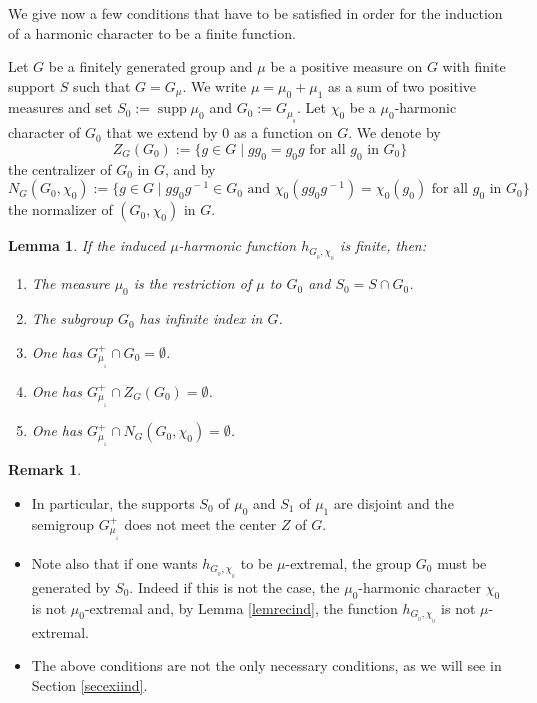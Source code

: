 \documentclass[JEP,XML,SOM,Unicode]{cedram}
\newenvironment{enumeratei}
{\bgroup\def\theenumi{\roman{enumi}}\def\theenumii{\arabic{enumii}}\begin{enumerate}}
{\end{enumerate}\egroup}
\DeclareMathOperator{\supp}{supp}
\newtheorem{Lem}[Thm]{Lemma}
\theoremstyle{definition}
\newtheorem{Rem}[Thm]{Remark}
\let\bq\relax
\let\eq\relax
\begin{document}
\bq
We give now a few conditions that have to be satisfied
in order for the induction of a harmonic character to be a finite function.
\eq

Let $G$ be a finitely generated group and
$\mu$ be a positive measure on $G$ with finite support $S$
such that $G=G_\mu$.
We write $\mu =\mu_0+\mu_1$ as a sum of two positive measures
and set $S_0:=\supp\mu_0$ and $G_0:=G_{\mu_{_0}}$.
Let $\chi_0$ be a $\mu_0$-harmonic character of $G_0$
that we extend by $0$ as a function on $G$.
We denote by
\[
Z_G(G_0):=\{g\in G\mid gg_0=g_0g\text{ for all $g_0$ in $G_0$}\}
\]
the centralizer of $G_0$ in $G$, and by
\[
N_G(G_0,\chi_0):=\{g\in G\mid gg_0g^{\!-1}\!\!\in\! G_0
\text{ and } \chi_0(gg_0g^{\!-1})=\chi_0(g_0)\text{ for all $g_0$ in $G_0$}\}
\]
the normalizer of $(G_0,\chi_0)$ in $G$.

\begin{Lem}
\label{lemindcha}
If the induced $\mu$-harmonic function $h_{G_{_0},\chi_{_0}}$ is finite, then:
\begin{enumeratei}
\item\label{lemindchai}
The measure $\mu_0$ is the restriction of $\mu$ to $G_0$ and $S_0=S\cap G_0$.
\item\label{lemindchaii}
The subgroup $G_0$ has infinite index in $G$.
\item\label{lemindchaiii}
One has $G_{\mu_{_1}}^+\cap G_0=\emptyset$.
\item\label{lemindchaiv}
One has $G_{\mu_{_1}}^+\cap Z_G(G_0)=\emptyset$.
\item\label{lemindchav}
One has $G_{\mu_{_1}}^+\cap N_G(G_0,\chi_0)=\emptyset$.
\end{enumeratei}
\end{Lem}

\skpt
\begin{Rem}
\begin{itemize}
\item
In particular, the supports $S_0$ of $\mu_0$ and $S_1$ of $\mu_1$ are disjoint
and the semigroup $G_{\mu_{_1}}^+$ does not meet the center $Z$ of $G$.

\item
Note also that if one wants $h_{G_{_0},\chi_{_0}}$ to be $\mu$-extremal, the group
$G_0$ must be generated by $S_0$. Indeed if this is not the case,
the $\mu_0$-harmonic character $\chi_0$ is not $\mu_0$-extremal and,
by Lemma \ref{lemrecind},
the function $h_{G_{_0},\chi_{_0}}$ is not $\mu$-extremal.

\item
The above conditions are not the only necessary conditions,
as we will see in Section \ref{secexiind}.

\end{itemize}
\end{Rem}
\end{document}
